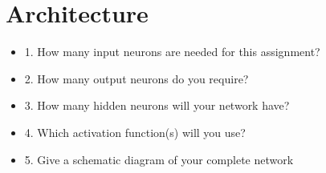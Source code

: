 \section{Architecture} \label {chapter:architecture}

\begin{itemize}

\item 1. How many input neurons are needed for this assignment?\\
\item 2. How many output neurons do you require?\\
\item 3. How many hidden neurons will your network have?\\
\item 4. Which activation function(s) will you use?\\
\item 5. Give a schematic diagram of your complete network\\

\end{itemize}
